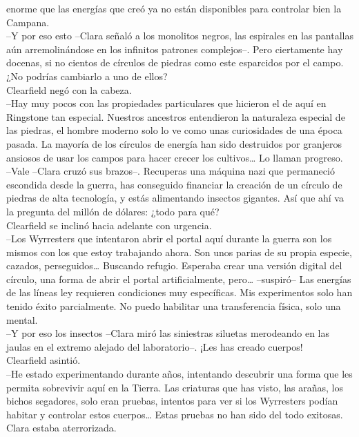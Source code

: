 enorme que las energías que creó ya no están disponibles para controlar
bien la Campana.\\
--Y por eso esto --Clara señaló a los monolitos negros, las espirales en
las pantallas aún arremolinándose en los infinitos patrones complejos--.
Pero ciertamente hay docenas, si no cientos de círculos de piedras como
este esparcidos por el campo. ¿No podrías cambiarlo a uno de ellos?\\
Clearfield negó con la cabeza.\\
--Hay muy pocos con las propiedades particulares que hicieron el de aquí
en Ringstone tan especial. Nuestros ancestros entendieron la naturaleza
especial de las piedras, el hombre moderno solo lo ve como unas
curiosidades de una época pasada. La mayoría de los círculos de energía
han sido destruidos por granjeros ansiosos de usar los campos para hacer
crecer los cultivos\ldots{} Lo llaman progreso.\\
--Vale --Clara cruzó sus brazos--. Recuperas una máquina nazi que
permaneció escondida desde la guerra, has conseguido financiar la
creación de un círculo de piedras de alta tecnología, y estás
alimentando insectos gigantes. Así que ahí va la pregunta del millón de
dólares: ¿todo para qué?\\
Clearfield se inclinó hacia adelante con urgencia.\\
--Los Wyrresters que intentaron abrir el portal aquí durante la guerra
son los mismos con los que estoy trabajando ahora. Son unos parias de su
propia especie, cazados, perseguidos\ldots{} Buscando refugio. Esperaba
crear una versión digital del círculo, una forma de abrir el portal
artificialmente, pero\ldots{} --suspiró-- Las energías de las líneas ley
requieren condiciones muy específicas. Mis experimentos solo han tenido
éxito parcialmente. No puedo habilitar una transferencia física, solo
una mental.\\
--Y por eso los insectos --Clara miró las siniestras siluetas merodeando
en las jaulas en el extremo alejado del laboratorio--. ¡Les has creado
cuerpos!\\
Clearfield asintió.\\
--He estado experimentando durante años, intentando descubrir una forma
que les permita sobrevivir aquí en la Tierra. Las criaturas que has
visto, las arañas, los bichos segadores, solo eran pruebas, intentos
para ver si los Wyrresters podían habitar y controlar estos
cuerpos\ldots{} Estas pruebas no han sido del todo exitosas.\\
Clara estaba aterrorizada.\\
